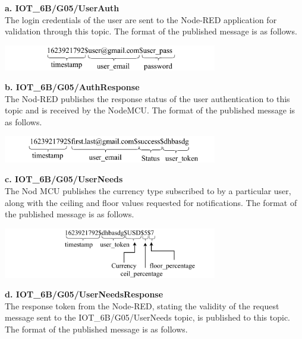 \textbf{a. IOT\_6B/G05/UserAuth}\\

The login credentials of the user are sent to the Node-RED application for validation through this topic. The format of the published message is as follows.


\begin{center}
\includegraphics[width=0.7\textwidth]{images/userauth.pdf}
\end{center}


\textbf{b. IOT\_6B/G05/AuthResponse}\\

The Nod-RED publishes the response status of the user authentication to this topic and is received by the NodeMCU. The format of the published message is as follows.

\begin{center}
      \includegraphics[width=0.7\textwidth]{images/authres.pdf}
\end{center}

\textbf{c. IOT\_6B/G05/UserNeeds}\\

The Nod MCU publishes the currency type subscribed to by a particular user, along with the ceiling and floor values requested for notifications. The format of the published message is as follows.


\begin{center}
\includegraphics[width=0.7\textwidth]{images/userneeds.pdf}
\end{center}


\textbf{d. IOT\_6B/G05/UserNeedsResponse}\\

The response token from the Node-RED, stating the validity of the request message sent to the IOT\_6B/G05/UserNeeds topic, is published to this topic.  The format of the published message is as follows.


